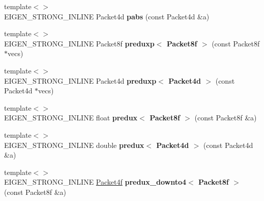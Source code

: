 \begin{DoxyCompactItemize}
\item 
\mbox{\label{namespace_eigen_1_1internal_ab356ec37bf991a4d80c18f998c3849cc}} 
{\footnotesize template$<$$>$ }\\E\+I\+G\+E\+N\+\_\+\+S\+T\+R\+O\+N\+G\+\_\+\+I\+N\+L\+I\+NE Packet4d {\bfseries pabs} (const Packet4d \&a)
\item 
\mbox{\label{namespace_eigen_1_1internal_aab4447f1586d6fb38a49fd152bef0f59}} 
{\footnotesize template$<$$>$ }\\E\+I\+G\+E\+N\+\_\+\+S\+T\+R\+O\+N\+G\+\_\+\+I\+N\+L\+I\+NE Packet8f {\bfseries preduxp$<$ Packet8f $>$} (const Packet8f $\ast$vecs)
\item 
\mbox{\label{namespace_eigen_1_1internal_a4fbcd1540669c574c021ba5055088625}} 
{\footnotesize template$<$$>$ }\\E\+I\+G\+E\+N\+\_\+\+S\+T\+R\+O\+N\+G\+\_\+\+I\+N\+L\+I\+NE Packet4d {\bfseries preduxp$<$ Packet4d $>$} (const Packet4d $\ast$vecs)
\item 
\mbox{\label{namespace_eigen_1_1internal_a6e06d9ef7d8b40fdb3e09cdd0a785929}} 
{\footnotesize template$<$$>$ }\\E\+I\+G\+E\+N\+\_\+\+S\+T\+R\+O\+N\+G\+\_\+\+I\+N\+L\+I\+NE float {\bfseries predux$<$ Packet8f $>$} (const Packet8f \&a)
\item 
\mbox{\label{namespace_eigen_1_1internal_a5d87e26dd9fd54cd7744c2403bba0325}} 
{\footnotesize template$<$$>$ }\\E\+I\+G\+E\+N\+\_\+\+S\+T\+R\+O\+N\+G\+\_\+\+I\+N\+L\+I\+NE double {\bfseries predux$<$ Packet4d $>$} (const Packet4d \&a)
\item 
\mbox{\label{namespace_eigen_1_1internal_a7bc80dff799ad8f5e75aab2ce62a7dcf}} 
{\footnotesize template$<$$>$ }\\E\+I\+G\+E\+N\+\_\+\+S\+T\+R\+O\+N\+G\+\_\+\+I\+N\+L\+I\+NE \hyperlink{struct_eigen_1_1internal_1_1_packet4f}{Packet4f} {\bfseries predux\+\_\+downto4$<$ Packet8f $>$} (const Packet8f \&a)
\item 
\mbox{\label{namespace_eigen_1_1internal_a20e4b47b36feca8e9d7683308b23b84a}} 

\end{DoxyCompactItemize}
